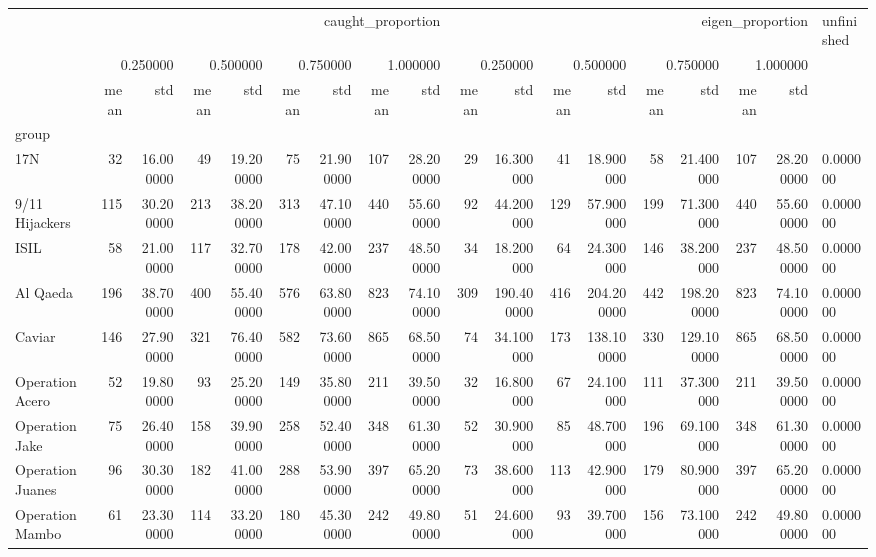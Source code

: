 \begin{tabular}{lrrrrrrrrrrrrrrrrl}
 & \multicolumn{8}{r}{caught_proportion} & \multicolumn{8}{r}{eigen_proportion} & unfinished \\
 & \multicolumn{2}{r}{0.250000} & \multicolumn{2}{r}{0.500000} & \multicolumn{2}{r}{0.750000} & \multicolumn{2}{r}{1.000000} & \multicolumn{2}{r}{0.250000} & \multicolumn{2}{r}{0.500000} & \multicolumn{2}{r}{0.750000} & \multicolumn{2}{r}{1.000000} &  \\
 & mean & std & mean & std & mean & std & mean & std & mean & std & mean & std & mean & std & mean & std &  \\
group &  &  &  &  &  &  &  &  &  &  &  &  &  &  &  &  &  \\
17N & 32 & 16.000000 & 49 & 19.200000 & 75 & 21.900000 & 107 & 28.200000 & 29 & 16.300000 & 41 & 18.900000 & 58 & 21.400000 & 107 & 28.200000 & 0.000000 \\
9/11 Hijackers & 115 & 30.200000 & 213 & 38.200000 & 313 & 47.100000 & 440 & 55.600000 & 92 & 44.200000 & 129 & 57.900000 & 199 & 71.300000 & 440 & 55.600000 & 0.000000 \\
ISIL & 58 & 21.000000 & 117 & 32.700000 & 178 & 42.000000 & 237 & 48.500000 & 34 & 18.200000 & 64 & 24.300000 & 146 & 38.200000 & 237 & 48.500000 & 0.000000 \\
Al Qaeda & 196 & 38.700000 & 400 & 55.400000 & 576 & 63.800000 & 823 & 74.100000 & 309 & 190.400000 & 416 & 204.200000 & 442 & 198.200000 & 823 & 74.100000 & 0.000000 \\
Caviar & 146 & 27.900000 & 321 & 76.400000 & 582 & 73.600000 & 865 & 68.500000 & 74 & 34.100000 & 173 & 138.100000 & 330 & 129.100000 & 865 & 68.500000 & 0.000000 \\
Operation Acero & 52 & 19.800000 & 93 & 25.200000 & 149 & 35.800000 & 211 & 39.500000 & 32 & 16.800000 & 67 & 24.100000 & 111 & 37.300000 & 211 & 39.500000 & 0.000000 \\
Operation Jake & 75 & 26.400000 & 158 & 39.900000 & 258 & 52.400000 & 348 & 61.300000 & 52 & 30.900000 & 85 & 48.700000 & 196 & 69.100000 & 348 & 61.300000 & 0.000000 \\
Operation Juanes & 96 & 30.300000 & 182 & 41.000000 & 288 & 53.900000 & 397 & 65.200000 & 73 & 38.600000 & 113 & 42.900000 & 179 & 80.900000 & 397 & 65.200000 & 0.000000 \\
Operation Mambo & 61 & 23.300000 & 114 & 33.200000 & 180 & 45.300000 & 242 & 49.800000 & 51 & 24.600000 & 93 & 39.700000 & 156 & 73.100000 & 242 & 49.800000 & 0.000000 \\

\end{tabular}
